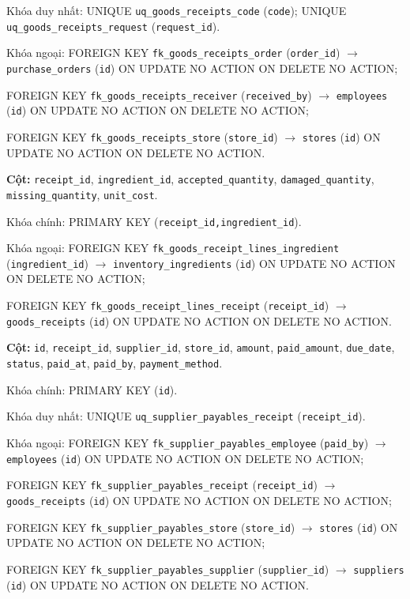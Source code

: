 \begin{description}[leftmargin=3.6cm,labelwidth=3.4cm,style=nextline]
Khóa duy nhất: UNIQUE \texttt{uq\_goods\_receipts\_code} (\texttt{code}); UNIQUE \texttt{uq\_goods\_receipts\_request} (\texttt{request\_id}).

Khóa ngoại: FOREIGN KEY \texttt{fk\_goods\_receipts\_order} (\texttt{order\_id}) $\rightarrow$ \texttt{purchase\_orders} (\texttt{id}) ON UPDATE NO ACTION ON DELETE NO ACTION;\par FOREIGN KEY \texttt{fk\_goods\_receipts\_receiver} (\texttt{received\_by}) $\rightarrow$ \texttt{employees} (\texttt{id}) ON UPDATE NO ACTION ON DELETE NO ACTION;\par FOREIGN KEY \texttt{fk\_goods\_receipts\_store} (\texttt{store\_id}) $\rightarrow$ \texttt{stores} (\texttt{id}) ON UPDATE NO ACTION ON DELETE NO ACTION.

\item[\texttt{goods\_receipt\_lines}] \textbf{Cột:} \texttt{receipt\_id}, \texttt{ingredient\_id}, \texttt{accepted\_quantity}, \texttt{damaged\_quantity}, \texttt{missing\_quantity}, \texttt{unit\_cost}.

Khóa chính: PRIMARY KEY (\texttt{receipt\_id,ingredient\_id}).

Khóa ngoại: FOREIGN KEY \texttt{fk\_goods\_receipt\_lines\_ingredient} (\texttt{ingredient\_id}) $\rightarrow$ \texttt{inventory\_ingredients} (\texttt{id}) ON UPDATE NO ACTION ON DELETE NO ACTION;\par FOREIGN KEY \texttt{fk\_goods\_receipt\_lines\_receipt} (\texttt{receipt\_id}) $\rightarrow$ \texttt{goods\_receipts} (\texttt{id}) ON UPDATE NO ACTION ON DELETE NO ACTION.

\item[\texttt{supplier\_payables}] \textbf{Cột:} \texttt{id}, \texttt{receipt\_id}, \texttt{supplier\_id}, \texttt{store\_id}, \texttt{amount}, \texttt{paid\_amount}, \texttt{due\_date}, \texttt{status}, \texttt{paid\_at}, \texttt{paid\_by}, \texttt{payment\_method}.

Khóa chính: PRIMARY KEY (\texttt{id}).

Khóa duy nhất: UNIQUE \texttt{uq\_supplier\_payables\_receipt} (\texttt{receipt\_id}).

Khóa ngoại: FOREIGN KEY \texttt{fk\_supplier\_payables\_employee} (\texttt{paid\_by}) $\rightarrow$ \texttt{employees} (\texttt{id}) ON UPDATE NO ACTION ON DELETE NO ACTION;\par FOREIGN KEY \texttt{fk\_supplier\_payables\_receipt} (\texttt{receipt\_id}) $\rightarrow$ \texttt{goods\_receipts} (\texttt{id}) ON UPDATE NO ACTION ON DELETE NO ACTION;\par FOREIGN KEY \texttt{fk\_supplier\_payables\_store} (\texttt{store\_id}) $\rightarrow$ \texttt{stores} (\texttt{id}) ON UPDATE NO ACTION ON DELETE NO ACTION;\par FOREIGN KEY \texttt{fk\_supplier\_payables\_supplier} (\texttt{supplier\_id}) $\rightarrow$ \texttt{suppliers} (\texttt{id}) ON UPDATE NO ACTION ON DELETE NO ACTION.


\end{description}
